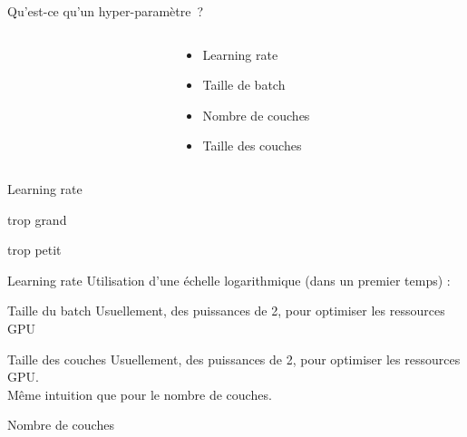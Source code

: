 \begin{frame}{Qu'est-ce qu'un hyper-paramètre~?}
  \begin{columns}
    \begin{column}[c]{0.5\textwidth}
    \end{column}
    \begin{column}[c]{0.5\textwidth}
      \begin{itemize}
        \item Learning rate
        \item Taille de batch
        \item Nombre de couches
        \item Taille des couches
      \end{itemize}
    \end{column}
  \end{columns}
\end{frame}

\begin{frame}{Learning rate}
  \begin{minipage}{0.49\textwidth}
    \centering
    trop grand
  \end{minipage}\hfill
  \begin{minipage}{0.49\linewidth}
    \centering
    trop petit
  \end{minipage}\hfill

\end{frame}

\begin{frame}{Learning rate}
  Utilisation d'une échelle logarithmique (dans un premier temps) :
\end{frame}

\begin{frame}{Taille du batch}
  Usuellement, des puissances de 2, pour optimiser les ressources GPU
\end{frame}

\begin{frame}{Taille des couches}
  Usuellement, des puissances de 2, pour optimiser les ressources GPU. \\
  Même intuition que pour le nombre de couches.
\end{frame}

\begin{frame}{Nombre de couches}
\end{frame}
